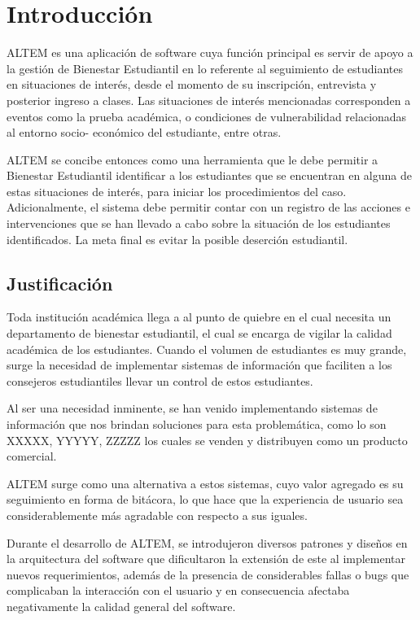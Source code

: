 \chapter{Introducci\'on}
ALTEM es una aplicación de software cuya función principal es servir de apoyo a la gestión de Bienestar Estudiantil en lo referente al seguimiento de estudiantes en situaciones de interés, desde el momento de su inscripción, entrevista y posterior ingreso a clases. Las situaciones de interés mencionadas corresponden a eventos como la prueba académica, o condiciones de vulnerabilidad relacionadas al entorno socio- económico del estudiante, entre otras.

ALTEM se concibe entonces como una herramienta que le debe permitir a Bienestar Estudiantil identificar a los estudiantes que se encuentran en alguna de estas situaciones de interés, para iniciar los procedimientos del caso. Adicionalmente, el sistema debe permitir contar con un registro de las acciones e intervenciones que se han llevado a cabo sobre la situación de los estudiantes identificados. La meta final es evitar la posible deserción estudiantil.

\section{Justificación}
Toda institución académica llega a al punto de quiebre en el cual necesita un departamento de bienestar estudiantil, el cual se encarga de vigilar la calidad académica de los estudiantes. Cuando el volumen de estudiantes es muy grande, surge la necesidad de implementar sistemas de información que faciliten a los consejeros estudiantiles llevar un control de estos estudiantes. 

Al ser una necesidad inminente, se han venido implementando sistemas de información que nos brindan soluciones para esta problemática, como lo son XXXXX, YYYYY, ZZZZZ los cuales se venden y distribuyen como un producto comercial.

ALTEM surge como una alternativa a estos sistemas, cuyo valor agregado es su seguimiento en forma de bitácora, lo que hace que la experiencia de usuario sea considerablemente más agradable con respecto a sus iguales.

Durante el desarrollo de ALTEM, se introdujeron diversos patrones y diseños en la arquitectura del software que dificultaron la extensión de este al implementar nuevos requerimientos, además de la presencia de considerables fallas o bugs que complicaban la interacción con el usuario y en consecuencia afectaba negativamente la calidad general del software.

